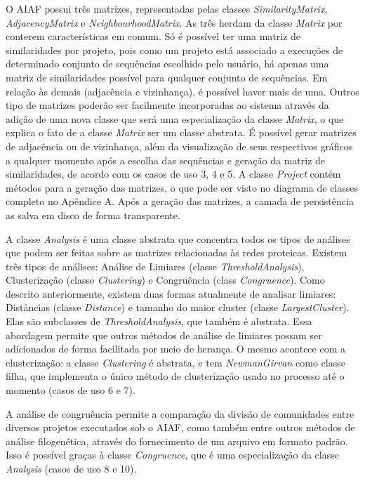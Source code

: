 O AIAF possui três matrizes, representadas pelas classes \textit{SimilarityMatrix}, \textit{AdjacencyMatrix} e \textit{NeighbourhoodMatrix}. As três herdam
da classe \textit{Matrix} por conterem características em comum. Só é possível ter uma matriz de similaridades por projeto, pois como um projeto está associado
a execuções de determinado conjunto de sequências escolhido pelo usuário, há apenas uma matriz de similaridades possível para qualquer conjunto de sequências.
Em relação às demais (adjacência e vizinhança), é possível haver mais de uma. Outros tipo de matrizes poderão ser
facilmente incorporadas ao sistema através da adição de uma nova classe que será uma especialização da classe \textit{Matrix}, o que explica o fato de a classe
\textit{Matrix} ser um classe abstrata. É possível gerar matrizes de adjacência ou de vizinhança, além da visualização de seus respectivos gráficos a qualquer
momento após a escolha das sequências e geração da matriz de similaridades, de acordo com os casos de uso 3, 4 e 5. A classe \textit{Project} contém métodos
para a geração das matrizes, o que pode ser visto no diagrama de classes completo no Apêndice A.
Após a geração das matrizes, a camada de persistência as salva em disco de forma transparente.

A classe \textit{Analysis} é uma classe abstrata que concentra todos os tipos de análises que podem ser feitas sobre as matrizes relacionadas às redes
proteicas. Existem três tipos de análises: Análise de Limiares (classe \textit{ThresholdAnalysis}), Clusterização (classe \textit{Clustering}) e
Congruência (class \textit{Congruence}). Como descrito anteriormente, existem duas formas atualmente de analisar limiares: Distâncias (classe
\textit{Distance}) e tamanho do maior cluster (classe \textit{LargestCluster}). Elas são subclasses de \textit{ThresholdAnalysis}, que também é abstrata. Essa
abordagem permite que outros métodos de análise de limiares possam ser adicionados de forma facilitada por meio de herança. O mesmo acontece com a
clusterização: a classe \textit{Clustering} é abstrata, e tem \textit{NewmanGirvan} como classe filha, que implementa o único método de clusterização
usado no processo até o momento (casos de uso 6 e 7).

A análise de congruência permite a comparação da divisão de comunidades entre diversos projetos executados sob o AIAF, como também entre outros métodos de
análise filogenética, através do fornecimento de um arquivo em formato padrão. Isso é possível graças à classe \textit{Congruence}, que é uma
especialização da classe
\textit{Analysis} (casos de uso 8 e 10).

